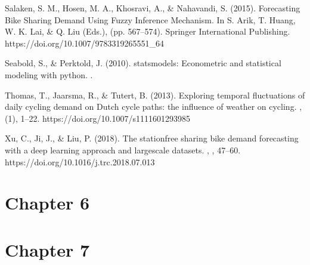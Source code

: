 \documentclass[letterpaper,10pt,english]{jupyterBook}
\begin{document}
\sphinxAtStartPar
Salaken, S. M., Hosen, M. A., Khosravi, A., \& Nahavandi, S. (2015). Forecasting Bike Sharing Demand Using Fuzzy Inference Mechanism. In S. Arik, T. Huang, W. K. Lai, \& Q. Liu (Eds.),  (pp. 567–574). Springer International Publishing. https://doi.org/10.1007/978\sphinxhyphen{}3\sphinxhyphen{}319\sphinxhyphen{}26555\sphinxhyphen{}1\_64

\sphinxAtStartPar
Seabold, S., \& Perktold, J. (2010). statsmodels: Econometric and statistical modeling with python. .

\sphinxAtStartPar
Thomas, T., Jaarsma, R., \& Tutert, B. (2013). Exploring temporal fluctuations of daily cycling demand on Dutch cycle paths: the influence of weather on cycling. , (1), 1–22. https://doi.org/10.1007/s11116\sphinxhyphen{}012\sphinxhyphen{}9398\sphinxhyphen{}5

\sphinxAtStartPar
Xu, C., Ji, J., \& Liu, P. (2018). The station\sphinxhyphen{}free sharing bike demand forecasting with a deep learning approach and large\sphinxhyphen{}scale datasets. , , 47–60. https://doi.org/10.1016/j.trc.2018.07.013


\section{Chapter 6}
\label{\detokenize{references:chapter-6}}

\section{Chapter 7}
\label{\detokenize{references:chapter-7}}






\renewcommand{\indexname}{Index}
\printindex
\end{document}
